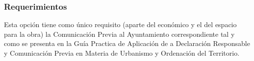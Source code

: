 \subsubsection{Requerimientos}
Esta opción tiene como único requisito (aparte del económico y el del espacio para la obra) la Comunicación Previa al Ayuntamiento correspondiente tal y como se presenta en la Guía Practica de Aplicación de a Declaración Responsable y Comunicación Previa en Materia de Urbanismo y Ordenación del Territorio. \cite{guiapracapdr} 




